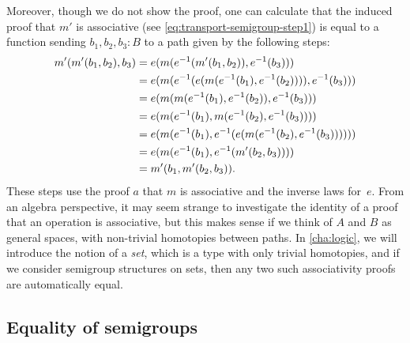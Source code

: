 Moreover, though we do not show the proof, one can calculate that the
induced proof that $m'$ is associative (see \eqref{eq:transport-semigroup-step1})
is equal to a function sending
$b_1,b_2,b_3 : B$ to a path given by the following steps:
\begin{equation}
  \label{eq:transport-semigroup-assoc}
  \begin{aligned}
    m'(m'(b_1,b_2),b_3)
    &= e(m(\mathord{{e}^{-1}}(m'(b_1,b_2)),\mathord{{e}^{-1}}(b_3))) \\
    &= e(m(\mathord{{e}^{-1}}(e(m(\mathord{{e}^{-1}}(b_1),\mathord{{e}^{-1}}(b_2)))),\mathord{{e}^{-1}}(b_3))) \\
    &= e(m(m(\mathord{{e}^{-1}}(b_1),\mathord{{e}^{-1}}(b_2)),\mathord{{e}^{-1}}(b_3))) \\
    &= e(m(\mathord{{e}^{-1}}(b_1),m(\mathord{{e}^{-1}}(b_2),\mathord{{e}^{-1}}(b_3)))) \\
    &= e(m(\mathord{{e}^{-1}}(b_1),\mathord{{e}^{-1}}(e(m(\mathord{{e}^{-1}}(b_2),\mathord{{e}^{-1}}(b_3)))))) \\
    &= e(m(\mathord{{e}^{-1}}(b_1),\mathord{{e}^{-1}}(m'(b_2,b_3)))) \\
    &= m'(b_1,m'(b_2,b_3)).
\end{aligned}
\end{equation}
These steps use the proof $a$ that $m$ is associative and the inverse
laws for~$e$.  From an algebra perspective, it may seem strange to
investigate the identity of a proof that an operation is associative,
but this makes sense if we think of $A$ and $B$ as general spaces, with
non-trivial homotopies between paths.  In \cref{cha:logic}, we will
introduce the notion of a \emph{set}, which is a type with only trivial
homotopies, and if we consider semigroup structures on sets, then any
two such associativity proofs are automatically equal.

\subsection{Equality of semigroups}
\label{sec:equality-semigroups}

